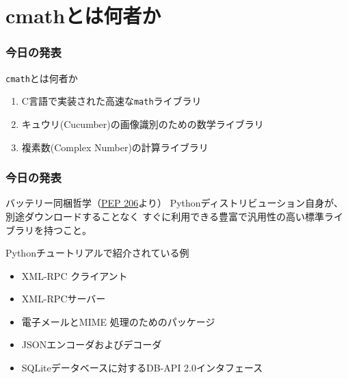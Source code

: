 \documentclass[dvipdfmx,11pt,notheorems]{beamer}
\theoremstyle{definition}
\begin{document}
\section{cmathとは何者か}

\begin{frame}\frametitle{今日の発表}

\begin{exampleblock}{\texttt{cmath}とは何者か}
\begin{enumerate}
\item C言語で実装された高速な\texttt{math}ライブラリ
\item キュウリ(Cucumber)の画像識別のための数学ライブラリ
\item 複素数(Complex Number)の計算ライブラリ
\end{enumerate}

\end{exampleblock}

\end{frame}

\begin{frame}\frametitle{今日の発表}

\begin{block}{バッテリー同梱哲学（\href{https://www.python.org/dev/peps/pep-0206/}{PEP 206}より）}
Pythonディストリビューション自身が、別途ダウンロードすることなく
すぐに利用できる豊富で汎用性の高い標準ライブラリを持つこと。
\end{block}

\begin{exampleblock}{Pythonチュートリアルで紹介されている例}
\begin{itemize}
\item {} XML-RPC クライアント
\item {} XML-RPCサーバー
\item {} 電子メールとMIME 処理のためのパッケージ
\item {} JSONエンコーダおよびデコーダ
\item {} SQLiteデータベースに対するDB-API 2.0インタフェース
\end{itemize}
\end{exampleblock}

\end{frame}
\end{document}
